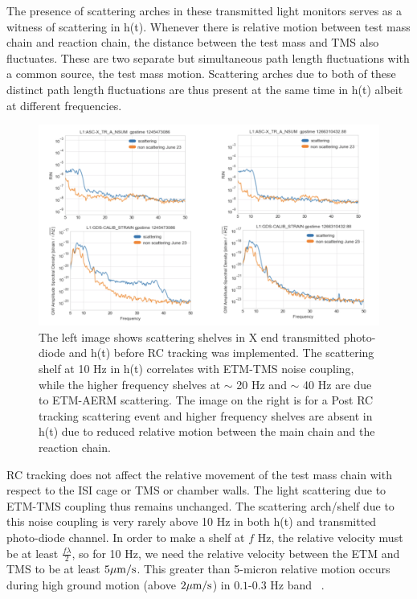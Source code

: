 \documentclass[12pt]{iopart}
\begin{document}
The presence of scattering arches in these transmitted light monitors serves as a witness of scattering in h(t). Whenever there is relative motion between test mass chain and reaction chain, the distance between the test mass and TMS also fluctuates. These are two separate but simultaneous path length fluctuations with a common source, the test mass motion. Scattering arches due to both of these distinct path length fluctuations are thus present at the same time in h(t) albeit at different frequencies.
\par
\begin{figure}[h]
    \centering
    \includegraphics[width=\textwidth]{etm-transmon1.png}
    \caption{The left image shows scattering shelves in X end transmitted photo-diode and h(t) before RC tracking was implemented. The scattering shelf at 10 Hz in h(t) correlates with ETM-TMS noise coupling, while the higher frequency shelves at $\sim$ 20 Hz and $\sim$ 40 Hz are due to ETM-AERM scattering. The image on the right is for a Post RC tracking scattering event and higher frequency shelves are absent in h(t) due to reduced relative motion between the main chain and the reaction chain.}
    \label{fig:etm-transmon}
\end{figure}
RC tracking does not affect the relative movement of the test mass chain with respect to the ISI cage or TMS or chamber walls. The light scattering due to ETM-TMS coupling thus remains unchanged. The scattering arch/shelf due to this noise coupling is very rarely above 10 Hz in both h(t) and transmitted photo-diode channel. In order to make a shelf at $f$ Hz, the relative velocity must be at least $\frac{f{\lambda}}{2}$, so for 10 Hz, we need the relative velocity between the ETM and TMS to be at least $5\mu{\rm m/s}$. This greater than 5-micron relative motion occurs during high ground motion (above $2\mu{\rm m/s}$) in $0.1$-$0.3$ Hz band ~\cite{alogsid_trans}.
\par
\end{document}
